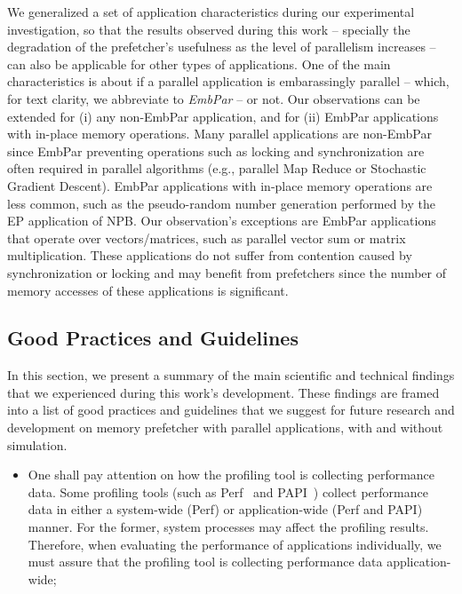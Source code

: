 \documentclass[AMA,final,STIX1COL]{WileyNJD-v2}
\begin{document}
{We generalized a set of application characteristics during our experimental investigation, so that the results observed during this work -- specially the degradation of the prefetcher's usefulness as the level of parallelism increases -- can also be applicable for other types of applications. 
One of the main characteristics is about if a parallel application is embarassingly parallel -- which, for text clarity, we abbreviate to \textit{EmbPar} -- or not. 
Our observations can be extended for (i) any non-EmbPar application, and for (ii) EmbPar applications with in-place memory operations. Many parallel applications are non-EmbPar since EmbPar preventing operations such as locking and synchronization are often required in parallel algorithms (e.g., parallel Map Reduce or Stochastic Gradient Descent). EmbPar applications with in-place memory operations are less common, such as the pseudo-random number generation performed by the EP application of NPB. Our observation's exceptions are EmbPar applications that operate over vectors/matrices, such as parallel vector sum or matrix multiplication. These applications do not suffer from contention caused by synchronization or locking and may benefit from prefetchers since the number of memory accesses of these applications is significant.


\subsection{Good Practices and Guidelines}
\label{subsec:practices_n_experiences}
In this section, we present a summary of the main scientific and technical findings that we experienced during this work's development. These findings are framed into a list of good practices and guidelines that we suggest for future research and development on memory prefetcher with parallel applications, with and without simulation.

\begin{itemize}
    \item One shall pay attention on how the profiling tool is collecting performance data. Some profiling tools (such as Perf~\cite{de2010new} and PAPI~\cite{terpstra2010papi}) collect performance data in either a system-wide (Perf) or application-wide (Perf and PAPI) manner. For the former, system processes may affect the profiling results. Therefore, when evaluating the performance of applications individually, we must assure that the profiling tool is collecting performance data application-wide;
    

\end{itemize}}
\end{document}
